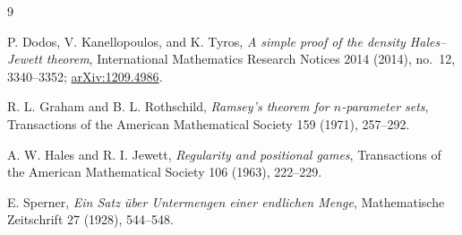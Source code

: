 \begin{thebibliography}{9}

P. Dodos, V. Kanellopoulos, and K. Tyros,
\emph{A simple proof of the density Hales--Jewett theorem},
International Mathematics Research Notices 2014 (2014), no.~12, 3340--3352;
\href{https://arxiv.org/abs/1209.4986}{arXiv:1209.4986}.

R. L. Graham and B. L. Rothschild,
\emph{Ramsey's theorem for $n$-parameter sets},
Transactions of the American Mathematical Society 159 (1971), 257--292.

A. W. Hales and R. I. Jewett,
\emph{Regularity and positional games},
Transactions of the American Mathematical Society 106 (1963), 222--229.

E. Sperner,
\emph{Ein Satz \"uber Untermengen einer endlichen Menge},
Mathematische Zeitschrift 27 (1928), 544--548.

\end{thebibliography}
